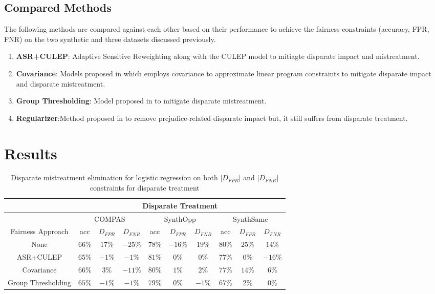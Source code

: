 \documentclass[runningheads]{llncs}
\begin{document}
\subsection{Compared Methods}
The following methods are compared against each other based on their performance to achieve the fairness constraints (accuracy, FPR, FNR) on the two synthetic and three datasets discussed previously.
\begin{enumerate}
\item \textbf{ASR+CULEP}: Adaptive Sensitive Reweighting along with the CULEP model to mitiagte disparate impact and mistreatment.
\item \textbf{Covariance}: Models proposed in \cite{zafar2015fairness} \cite{zafar2017fairness} which employs covariance to approximate linear program constraints to mitigate disparate impact and disparate mistreatment.
\item \textbf{Group Thresholding}: Model proposed in \cite{hardt2016equality} to mitigate disparate mistreatment.
\item \textbf{Regularizer}:Method proposed in \cite{kamishima2012fairness} to remove prejudice-related disparate impact but, it still suffers from disparate treatment.
\end{enumerate}
\section{Results}
\begin{table}[!htbp]
      \centering
\begin{tabular}{|c|c|c|c|c|c|c|c|c|c|}
\hline
{} & \multicolumn{9}{c}{Disparate Treatment} \vline \\
\hline
{} & \multicolumn{3}{c|}{COMPAS} & \multicolumn{3}{c|}{SynthOpp} & \multicolumn{3}{c|}{SynthSame} \vline \\
\hline
Fairness Approach & acc & $D_{FPR}$ & $D_{FNR}$ & acc & $D_{FPR}$ & $D_{FNR}$ & acc & $D_{FPR}$ & $D_{FNR}$ \\
\hline
None & $66\%$ & $17\%$  & $-25\%$  & $78\%$  & $-16\%$  & $19\%$  & $80\%$  & $25\%$  & $14\%$  \\
\hline
ASR+CULEP & $65\%$ & $-1\%$  & $-1\%$  & $81\%$  & $0\%$  & $0\%$  & $77\%$  & $0\%$  & $-16\%$  \\
\hline
Covariance & $66\%$ & $3\%$  & $-11\%$  & $80\%$  & $1\%$  & $2\%$  & $77\%$  & $14\%$  & $6\%$  \\
\hline
Group Thresholding & $65\%$ & $-1\%$  & $-1\%$  & $79\%$  & $0\%$  & $-1\%$  & $67\%$  & $2\%$  & $0\%$  \\
\hline 
\end{tabular}
\\
\caption{Disparate mistreatment elimination for logistic regression on both $|D_{FPR}|$ and $|D_{FNR}|$ constraints for disparate treatment}
\label{tab:disptreatmenttable}
\end{table}
\end{document}
